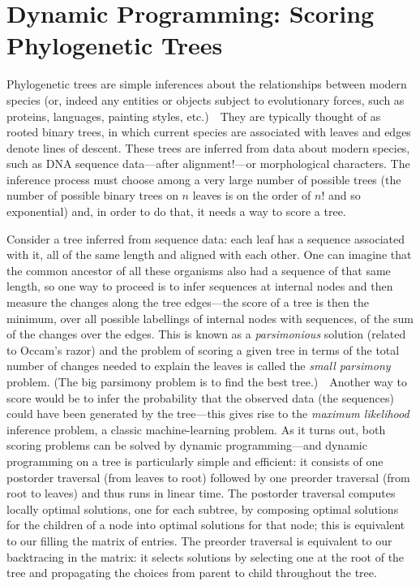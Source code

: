 \documentclass[11pt]{article}
\begin{document}
\section{Dynamic Programming: Scoring Phylogenetic Trees}
Phylogenetic trees are simple inferences about the relationships
between modern species (or, indeed any entities or objects subject
to evolutionary forces, such as proteins, languages, painting styles,
etc.)\ \ They
are typically thought of as rooted binary trees, in which current
species are associated with leaves and edges denote lines of descent.
These trees are inferred from data about modern species, such as
DNA sequence data---after alignment!---or morphological characters.
The inference process must choose among a very large number of possible
trees (the number of possible binary trees on $n$ leaves is on the
order of $n!$ and so exponential) and, in order to do that, it needs
a way to score a tree.

Consider a tree inferred from sequence data:
each leaf has a sequence associated with it, all of the same length
and aligned with each other.  One can imagine that the common
ancestor of all these organisms also had a sequence of that same
length, so one way to proceed is to infer sequences at internal nodes
and then measure the changes along the tree edges---the score of a
tree is then the minimum, over all possible labellings of internal
nodes with sequences, of the sum of the changes over the edges.
This is known as a \emph{parsimonious} solution (related to Occam's razor)
and the problem of scoring a given tree in terms
of the total number of changes needed to explain the leaves is called
the \emph{small parsimony} problem.  (The big parsimony problem is
to find the best tree.)\ \ Another way to score would be to infer the
probability that the observed data (the sequences) could have been
generated by the tree---this gives rise to the \emph{maximum likelihood}
inference problem, a classic machine-learning problem.  As it turns
out, both scoring problems can be solved by dynamic programming---and
dynamic programming on a tree is particularly simple and efficient:
it consists of one postorder traversal (from leaves to root) followed
by one preorder traversal (from root to leaves) and thus runs in linear
time.  The postorder traversal computes locally optimal solutions,
one for each subtree, by composing optimal solutions for the children
of a node into optimal solutions for that node; this is equivalent to
our filling the matrix of entries.  The preorder traversal is equivalent
to our backtracing in the matrix: it selects solutions by selecting one
at the root of the tree and propagating the choices from parent to child
throughout the tree.
\end{document}
